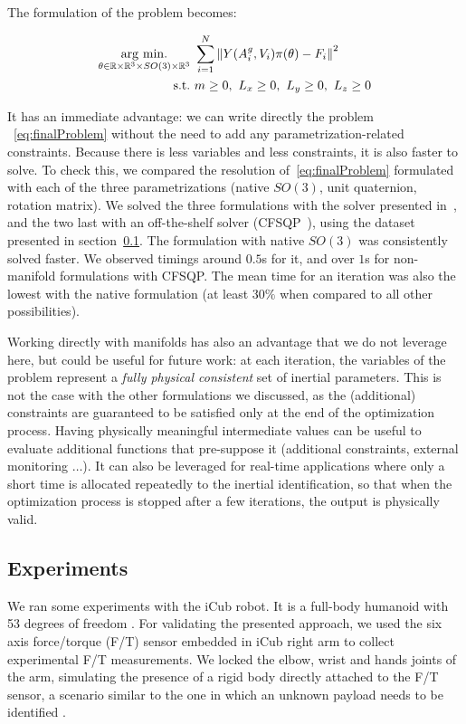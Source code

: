 The formulation of the problem becomes:

\begin{equation}
\begin{aligned}
\label{eq:finalProblem}
    \operatorname*{arg\ min.}_{\theta \in \mathbb{R}\times\mathbb{R}^3\times SO(3) \times \mathbb{R}^3} &\ \sum_{i = 1}^N \left\| Y(A^g_i, V_i) \pi(\theta) - F_i \right\|^2 \\
    \mbox{s.t.} &\ m \geq 0,\ L_x \geq 0,\ L_y \geq 0,\ L_z \geq 0
\end{aligned}
\end{equation}

It has an immediate advantage: we can write directly the problem ~\eqref{eq:finalProblem} without the need to add any parametrization-related constraints.
Because there is less variables and less constraints, it is also faster to solve.
To check this, we compared the resolution of~\eqref{eq:finalProblem} formulated with each of the three parametrizations (native $SO(3)$, unit quaternion, rotation matrix).
We solved the three formulations with the solver presented in~\cite{brossette:Humanoids:2015}, and the two last with an off-the-shelf solver (CFSQP~\cite{cfsqp:manual}), using the dataset presented in section~\ref{sub:experiments}.
The formulation with native $SO(3)$ was consistently solved faster.
We observed timings around $0.5$s for it, and over $1$s for non-manifold formulations with CFSQP.
The mean time for an iteration was also the lowest with the native formulation (at least $30\%$ when compared to all other possibilities).

Working directly with manifolds has also an advantage that we do not leverage here, but could be useful for future work: at each iteration, the variables of the problem represent a \emph{fully physical consistent} set of inertial parameters.
This is not the case with the other formulations we discussed, as the (additional) constraints are guaranteed to be satisfied only at the end of the optimization process.
Having physically meaningful intermediate values can be useful to evaluate additional functions that pre-suppose it (additional constraints, external monitoring $\ldots$).
It can also be leveraged for real-time applications where only a short time is allocated repeatedly to the inertial identification, so that when the optimization process is stopped after a few iterations, the output is physically valid.

\subsection{Experiments}
\label{sub:experiments}
We ran some experiments with the iCub robot.
It is a full-body humanoid with 53 degrees of freedom \cite{metta2010icub}.
For validating the presented approach, we used the six axis force/torque (F/T) sensor embedded in iCub right arm to collect experimental F/T measurements.
We locked the elbow, wrist and hands joints of the arm, simulating the presence of a rigid body directly attached to the F/T sensor, a scenario similar to the one in which an unknown payload needs to be identified \cite{kubus2008line}.

